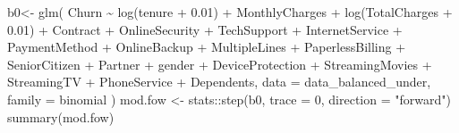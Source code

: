 \documentclass[
  twoside]{article}
\newenvironment{Shaded}{\begin{snugshade}}{\end{snugshade}}
\newcommand{\AttributeTok}[1]{\textcolor[rgb]{0.77,0.63,0.00}{#1}}
\newcommand{\DecValTok}[1]{\textcolor[rgb]{0.00,0.00,0.81}{#1}}
\newcommand{\FloatTok}[1]{\textcolor[rgb]{0.00,0.00,0.81}{#1}}
\newcommand{\FunctionTok}[1]{\textcolor[rgb]{0.00,0.00,0.00}{#1}}
\newcommand{\NormalTok}[1]{#1}
\newcommand{\OtherTok}[1]{\textcolor[rgb]{0.56,0.35,0.01}{#1}}
\newcommand{\SpecialCharTok}[1]{\textcolor[rgb]{0.00,0.00,0.00}{#1}}
\newcommand{\StringTok}[1]{\textcolor[rgb]{0.31,0.60,0.02}{#1}}
\begin{document}
\begin{Shaded}
\begin{Highlighting}[]
\NormalTok{b0}\OtherTok{\textless{}{-}} \FunctionTok{glm}\NormalTok{(}
\NormalTok{  Churn }\SpecialCharTok{\textasciitilde{}} \FunctionTok{log}\NormalTok{(tenure }\SpecialCharTok{+} \FloatTok{0.01}\NormalTok{)}
  \SpecialCharTok{+}\NormalTok{ MonthlyCharges}
  \SpecialCharTok{+} \FunctionTok{log}\NormalTok{(TotalCharges }\SpecialCharTok{+} \FloatTok{0.01}\NormalTok{)}
  \SpecialCharTok{+}\NormalTok{ Contract }\SpecialCharTok{+}\NormalTok{ OnlineSecurity }\SpecialCharTok{+}\NormalTok{ TechSupport }\SpecialCharTok{+}\NormalTok{ InternetService }\SpecialCharTok{+}\NormalTok{ PaymentMethod }
  \SpecialCharTok{+}\NormalTok{ OnlineBackup }\SpecialCharTok{+}\NormalTok{ MultipleLines }\SpecialCharTok{+}\NormalTok{ PaperlessBilling }\SpecialCharTok{+}\NormalTok{ SeniorCitizen }\SpecialCharTok{+}\NormalTok{ Partner }
  \SpecialCharTok{+}\NormalTok{ gender }\SpecialCharTok{+}\NormalTok{ DeviceProtection }\SpecialCharTok{+}\NormalTok{ StreamingMovies }\SpecialCharTok{+}\NormalTok{ StreamingTV }\SpecialCharTok{+}\NormalTok{ PhoneService }
  \SpecialCharTok{+}\NormalTok{ Dependents,}
  \AttributeTok{data =}\NormalTok{ data\_balanced\_under,}
  \AttributeTok{family =}\NormalTok{ binomial}
\NormalTok{)}
\NormalTok{mod.fow }\OtherTok{\textless{}{-}}\NormalTok{ stats}\SpecialCharTok{::}\FunctionTok{step}\NormalTok{(b0, }\AttributeTok{trace =} \DecValTok{0}\NormalTok{, }\AttributeTok{direction =} \StringTok{"forward"}\NormalTok{)}
\FunctionTok{summary}\NormalTok{(mod.fow)}
\end{Highlighting}
\end{Shaded}
\end{document}
